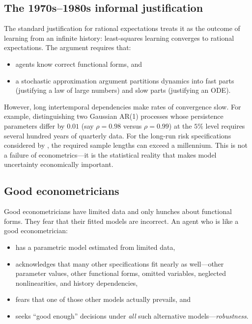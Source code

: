 \documentclass[12pt]{article}
\theoremstyle{definition}
\begin{document}
\subsection{The 1970s--1980s informal justification}

The standard justification for rational expectations treats it as the
outcome of learning from an infinite history: least-squares learning
converges to rational expectations.  The argument requires that:
\begin{itemize}
\item agents know correct functional forms, and
\item a stochastic approximation argument partitions dynamics into fast
      parts (justifying a law of large numbers) and slow parts
      (justifying an ODE).
\end{itemize}
However, long intertemporal dependencies make
{\color{red} rates of convergence slow}.
For example, distinguishing two Gaussian AR(1) processes whose
persistence parameters differ by $0.01$ (say $\rho = 0.98$ versus
$\rho = 0.99$) at the $5\%$ level requires several hundred years of
quarterly data.  For the long-run risk specifications considered by
\citet{BY2004}, the required sample lengths can exceed a
millennium.  This is not a failure of econometrics---it is the
statistical reality that makes model uncertainty economically important.

\subsection{Good econometricians}

Good econometricians have limited data and only hunches about functional
forms.  They fear that their fitted models are incorrect.  An agent who
is like a good econometrician:
\begin{itemize}
\item has a parametric model estimated from limited data,
\item acknowledges that many other specifications fit nearly as
      well---other parameter values, other functional forms, omitted
      variables, neglected nonlinearities, and history dependencies,
\item fears that one of those other models actually prevails, and
\item seeks ``good enough'' decisions under \emph{all} such alternative
      models---\emph{robustness}.
\end{itemize}


\end{document}
